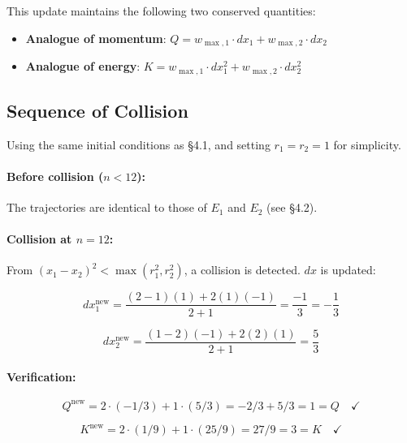 \documentclass[12pt,a4paper]{article}
\begin{document}
This update maintains the following two conserved quantities:

\begin{itemize}
  \item \textbf{Analogue of momentum}: $Q = w_{\max,1} \cdot dx_1 + w_{\max,2} \cdot dx_2$
  \item \textbf{Analogue of energy}: $K = w_{\max,1} \cdot dx_1^2 + w_{\max,2} \cdot dx_2^2$
\end{itemize}

\subsection{Sequence of Collision}

Using the same initial conditions as \S4.1, and setting $r_1 = r_2 = 1$ for simplicity.

\paragraph{Before collision ($n < 12$):}

The trajectories are identical to those of $E_1$ and $E_2$ (see \S4.2).

\paragraph{Collision at $n = 12$:}

From $(x_1 - x_2)^2 < \max(r_1^2, r_2^2)$, a collision is detected. $dx$ is updated:

\begin{equation}
  dx_1^{\text{new}} = \frac{(2-1)(1) + 2(1)(-1)}{2+1} = \frac{-1}{3} = -\frac{1}{3}
\end{equation}

\begin{equation}
  dx_2^{\text{new}} = \frac{(1-2)(-1) + 2(2)(1)}{2+1} = \frac{5}{3}
\end{equation}

\paragraph{Verification:}

\begin{equation}
  Q^{\text{new}} = 2 \cdot (-1/3) + 1 \cdot (5/3) = -2/3 + 5/3 = 1 = Q \quad \checkmark
\end{equation}

\begin{equation}
  K^{\text{new}} = 2 \cdot (1/9) + 1 \cdot (25/9) = 27/9 = 3 = K \quad \checkmark
\end{equation}
\end{document}
